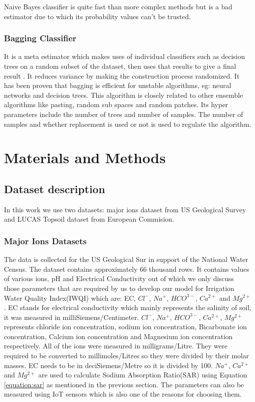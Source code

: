Naive Bayes classifier is quite fast than more complex methods but is a bad estimator due to which its probability values can’t be trusted.

\subsubsection{Bagging Classifier}
\label{subsubsection:baggingClassifier}
It is a meta estimator which makes uses of individual classifiers such as decision trees on a random subset of the dataset, then uses that results to give a final result \cite{article:baggingClassifier}. It reduces variance by making the construction process randomized. It has been proven that bagging is efficient for unstable algorithms, eg: neural networks and decision trees. This algorithm is closely related to other ensemble algorithms like pasting, random sub spaces and random patches. Its hyper parameters include the number of trees and number of samples. The number of samples and whether replacement is used or not is used to regulate the algorithm.


\section{Materials and Methods}
\label{section:materialAndMethods}

\subsection{Dataset description}
\label{subsection:datasets}
In this work we use two datasets: major ions dataset from US Geological Survey\cite{dataset:majorIons} and LUCAS Topsoil dataset\cite{dataset:lucas} from European Commision.

\subsubsection{Major Ions Datasets}
\label{subsubsection:majorIons}
The data is collected for the US Geological Sur\cite{dataset:majorIons} in support of the National Water Census. The dataset contains approximately 66 thousand rows. It contains values of various ions, pH and Electrical Conductivity out of which we only discuss those parameters that are required by us to develop our model for Irrigation Water Quality Index(IWQI) which are: EC, $Cl^-$, $Na^+$, $HCO^{3-}$, $Ca^{2+}$ and $Mg^{2+}$. EC stands for electrical conductivity which mainly represents the salinity of soil, it was measured in milliSiemens/Centimeter. $Cl^-$, $Na^+$, $HCO^{3-}$, $Ca^{2+}$, $Mg^{2+}$ represents chloride ion concentration, sodium ion concentration, Bicarbonate ion concentration, Calcium ion concentration and Magnesium ion concentration respectively. All of the ions were measured in milligrams/Litre. They were required to be converted to millimoles/Litres so they were divided by their molar masses. EC needs to be in deciSiemens/Metre so it is divided by 100. $Na^+$, $Ca^{2+}$ and $Mg^{2+}$ are used to calculate Sodium Absorption Ratio(SAR) using Equation \ref{equation:sar} as mentioned in the previous section. The parameters can also be measured using IoT sensors which is also one of the reasons for choosing them. 

